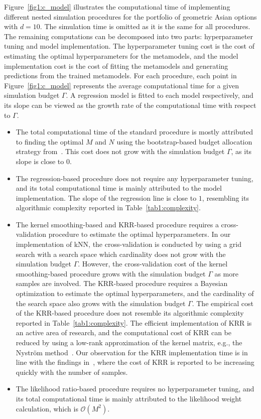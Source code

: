 Figure~\ref{fig1:c_model} illustrates the computational time of implementing different nested simulation procedures for the portfolio of geometric Asian options with $d = 10$.
The simulation time is omitted as it is the same for all procedures.
The remaining computations can be decomposed into two parts: hyperparameter tuning and model implementation.
The hyperparameter tuning cost is the cost of estimating the optimal hyperparameters for the metamodels, and the model implementation cost is the cost of fitting the metamodels and generating predictions from the trained metamodels.
For each procedure, each point in Figure~\ref{fig1:c_model} represents the average computational time for a given simulation budget $\Gamma$.
A regression model is fitted to each model respectively, and its slope can be viewed as the growth rate of the computational time with respect to $\Gamma$.
\begin{itemize}
    \item The total computational time of the standard procedure is mostly attributed to finding the optimal $M$ and $N$ using the bootstrap-based budget allocation strategy from~\cite{zhang2021bootstrap}.
    This cost does not grow with the simulation budget $\Gamma$, as its slope is close to $0$.
    \item The regression-based procedure does not require any hyperparameter tuning, and its total computational time is mainly attributed to the model implementation.
    The slope of the regression line is close to $1$, resembling its algorithmic complexity reported in Table~\ref{tab1:complexity}.
    \item The kernel smoothing-based and KRR-based procedure requires a cross-validation procedure to estimate the optimal hyperparameters. 
    In our implementation of kNN, the cross-validation is conducted by using a grid search with a search space which cardinality does not grow with the simulation budget $\Gamma$.
    However, the cross-validation cost of the kernel smoothing-based procedure grows with the simulation budget $\Gamma$ as more samples are involved.
    The KRR-based procedure requires a Bayesian optimization to estimate the optimal hyperparameters, and the cardinality of the search space also grows with the simulation budget $\Gamma$.
    The empirical cost of the KRR-based procedure does not resemble its algorithmic complexity reported in Table~\ref{tab1:complexity}.
    The efficient implementation of KRR is an active area of research, and the computational cost of KRR can be reduced by using a low-rank approximation of the kernel matrix, e.g., the Nystr\"om method~\citep{nystrom1930praktische}.
    Our observation for the KRR implementation time is in line with the findings in~\cite{scikit-learn}, where the cost of KRR is reported to be increasing quickly with the number of samples.
    \item The likelihood ratio-based procedure requires no hyperparameter tuning, and its total computational time is mainly attributed to the likelihood weight calculation, which is $\mathcal{O}(M^2)$. 
\end{itemize}
